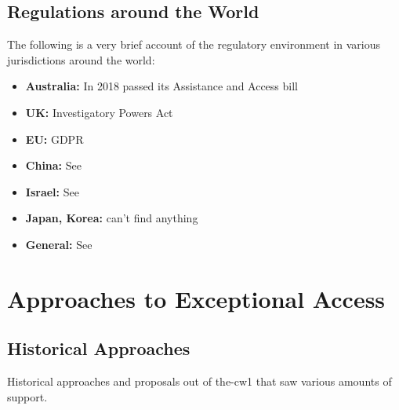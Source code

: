 \subsection{Regulations around the World}

The following is a very brief account of the regulatory environment in various jurisdictions around the world:

\newcommand{\countriesstart}{\begin{itemize}}
\newcommand{\country}[1]{\item \textbf{#1:}} %
\newcommand{\countriesend}{\end{itemize}}

\countriesstart
    \country{Australia} In 2018 passed its Assistance and Access bill \cite{ag_2018} \cite{newman_2018}
    \country{UK} Investigatory Powers Act \cite{legislature_2016}
    \country{EU} GDPR \cite{parliament_2016}
    \country{China} See \cite{donahue_comparative_2018}
    \country{Israel} See \cite{donahue_comparative_2018}
    \country{Japan, Korea} can't find anything
    \country{General} See \cite{budish_encryption_2018}
\countriesend



\section{Approaches to Exceptional Access}
\label{sec-tech-approaches}



\subsection{Historical Approaches}

Historical approaches and proposals out of \ac{the-cw1} that saw various amounts of support.

